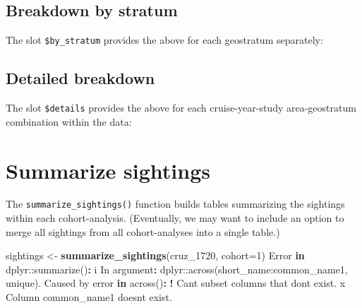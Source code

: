 \documentclass[
]{book}
\newenvironment{Shaded}{\begin{snugshade}}{\end{snugshade}}
\newcommand{\AttributeTok}[1]{\textcolor[rgb]{0.13,0.29,0.53}{#1}}
\newcommand{\ControlFlowTok}[1]{\textcolor[rgb]{0.13,0.29,0.53}{\textbf{#1}}}
\newcommand{\DecValTok}[1]{\textcolor[rgb]{0.00,0.00,0.81}{#1}}
\newcommand{\FunctionTok}[1]{\textcolor[rgb]{0.13,0.29,0.53}{\textbf{#1}}}
\newcommand{\NormalTok}[1]{#1}
\newcommand{\OtherTok}[1]{\textcolor[rgb]{0.56,0.35,0.01}{#1}}
\newcommand{\SpecialCharTok}[1]{\textcolor[rgb]{0.81,0.36,0.00}{\textbf{#1}}}
\newcommand{\StringTok}[1]{\textcolor[rgb]{0.31,0.60,0.02}{#1}}
\begin{document}
\hypertarget{breakdown-by-stratum}{%
\subsection*{Breakdown by stratum}\label{breakdown-by-stratum}}

The slot \texttt{\$by\_stratum} provides the above for each geostratum separately:

\hypertarget{detailed-breakdown}{%
\subsection*{Detailed breakdown}\label{detailed-breakdown}}

The slot \texttt{\$details} provides the above for each cruise-year-study area-geostratum combination within the data:

\hypertarget{summarize-sightings}{%
\section*{Summarize sightings}\label{summarize-sightings}}

The \texttt{summarize\_sightings()} function builds tables summarizing the sightings within each cohort-analysis. (Eventually, we may want to include an option to merge all sightings from all cohort-analyses into a single table.)

\begin{Shaded}
\begin{Highlighting}[]
\NormalTok{sightings }\OtherTok{\textless{}{-}} \FunctionTok{summarize\_sightings}\NormalTok{(cruz\_1720,}
                                 \AttributeTok{cohort=}\DecValTok{1}\NormalTok{)}
\NormalTok{Error }\ControlFlowTok{in} \StringTok{\textasciigrave{}}\AttributeTok{dplyr::summarize()}\StringTok{\textasciigrave{}}\SpecialCharTok{:}
\NormalTok{i In argument}\SpecialCharTok{:} \StringTok{\textasciigrave{}}\AttributeTok{dplyr::across(short\_name:common\_name1, unique)}\StringTok{\textasciigrave{}}\NormalTok{.}
\NormalTok{Caused by error }\ControlFlowTok{in} \StringTok{\textasciigrave{}}\AttributeTok{across()}\StringTok{\textasciigrave{}}\SpecialCharTok{:}
\SpecialCharTok{!}\NormalTok{ Can}\StringTok{\textquotesingle{}t subset columns that don\textquotesingle{}}\NormalTok{t exist.}
\NormalTok{x Column }\StringTok{\textasciigrave{}}\AttributeTok{common\_name1}\StringTok{\textasciigrave{}}\NormalTok{ doesn}\StringTok{\textquotesingle{}t exist.}
\end{Highlighting}
\end{Shaded}
\end{document}
